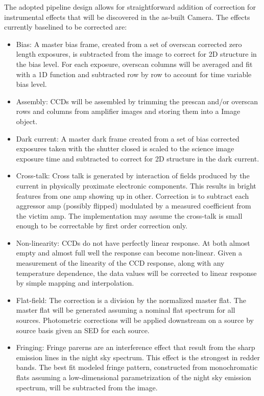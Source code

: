 \documentclass[12pt]{article}
\begin{document}
The adopted pipeline design allows for straightforward addition of correction for instrumental effects that will be discovered in the as-built Camera. The effects currently baselined to be corrected are:

\begin{itemize}
\item Bias: A master bias frame, created from a set of overscan corrected zero length exposures, is subtracted from the image to correct for 2D structure in the bias level. For each exposure, overscan columns will be averaged and fit with a 1D function and subtracted row by row to account for time variable bias level.

\item Assembly: CCDs will be assembled by trimming the prescan and/or overscan rows and columns from amplifier images and storing them into a Image object.

\item Dark current: A master dark frame created from a set of bias corrected exposures taken with the shutter closed is scaled to the science image exposure time and subtracted to correct for 2D structure in the dark current.

\item Cross-talk: Cross talk is generated by interaction of fields produced by the current in physically proximate electronic components. This results in bright features from one amp showing up in other. Correction is to subtract each aggressor amp (possibly flipped) modulated by a measured coefficient from the victim amp. The implementation may assume the cross-talk is small enough to be correctable by first order correction only.

\item Non-linearity: CCDs do not have perfectly linear response. At both almost empty and almost full well the response can become non-linear. Given a measurement of the linearity of the CCD response, along with any temperature dependence, the data values will be corrected to linear response by simple mapping and interpolation.

\item Flat-field: The correction is a division by the normalized master flat. The master flat will be generated assuming a nominal flat spectrum for all sources. Photometric corrections will be applied downstream on a source by source basis given an SED for each source.

\item Fringing: Fringe parerns are an interference effect that result from the sharp emission lines in the night sky spectrum. This effect is the strongest in redder bands. The best fit modeled fringe pattern, constructed from monochromatic flats assuming a low-dimensional parametrization of the night sky emission spectrum, will be subtracted from the image.


\end{itemize}
\end{document}
